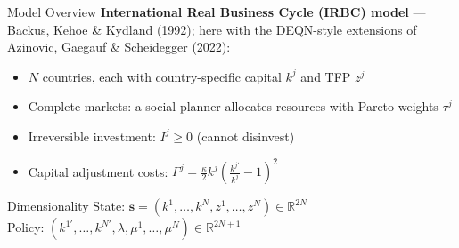 \documentclass[aspectratio=169,11pt]{beamer}
\newcommand{\emphc}[1]{\textcolor{harvardcrimson}{#1}}
\newcommand{\R}{\mathbb{R}}
\begin{document}
\begin{frame}{Model Overview}
\textbf{International Real Business Cycle (IRBC) model} --- Backus, Kehoe \& Kydland (1992); here with the DEQN-style extensions of Azinovic, Gaegauf \& Scheidegger (2022):

\vspace{0.5em}
\begin{itemize}
    \item $N$ countries, each with \emphc{country-specific capital} $k^j$ and \emphc{TFP} $z^j$
    \item \emphc{Complete markets}: a social planner allocates resources with Pareto weights $\tau^j$
    \item \emphc{Irreversible investment}: $I^j \geq 0$ (cannot disinvest)
    \item \emphc{Capital adjustment costs}: $\Gamma^j = \frac{\kappa}{2} k^j \!\left(\frac{k^{j\prime}}{k^j} - 1\right)^{\!2}$
\end{itemize}

\vspace{0.5em}
\begin{block}{Dimensionality}
State: $\bm{s} = (k^1, \ldots, k^N, z^1, \ldots, z^N) \in \R^{2N}$\\
Policy: $(k^{1\prime}, \ldots, k^{N\prime}, \lambda, \mu^1, \ldots, \mu^N) \in \R^{2N+1}$
\end{block}
\end{frame}
\end{document}
